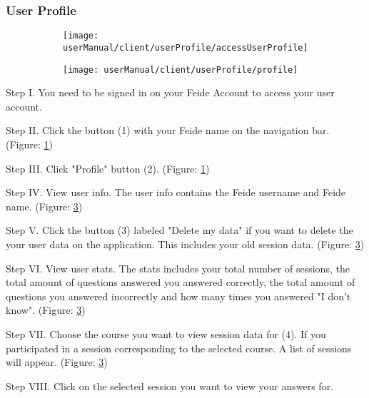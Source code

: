 \subsubsection{User Profile}
\begin{figure}[H]
	\begin{subfigure}{0.80\linewidth}
		\texttt{[image: userManual/client/userProfile/accessUserProfile]}
		\caption{}
		\label{fig:accessUserProfile}	
	\end{subfigure}
	\begin{subfigure}{0.80\linewidth}
		\texttt{[image: userManual/client/userProfile/profile]}
		\caption{}
		\label{fig:profilePage}
	\end{subfigure}
\end{figure}

\begin{userManualItemlist}
	\item[Step I.] You need to be signed in on your Feide Account to access your user account. 
	\item[Step II.] Click the button (1) with your Feide name on the navigation bar. (Figure: \ref{fig:accessUserProfile})
	\item[Step III.] Click "Profile" button (2). (Figure: \ref{fig:accessUserProfile})
	\item[Step IV.] View user info. The user info contains the Feide username and Feide name. (Figure: \ref{fig:profilePage})
	\item[Step V.] Click the button (3) labeled "Delete my data" if you want to delete the your user data on the application. This includes your old session data. (Figure: \ref{fig:profilePage})
	\item[Step VI.] View user stats. The stats includes your total number of sessions, the total amount of questions answered you answered correctly, the total amount of questions you answered incorrectly and how many times you answered "I don't know". (Figure: \ref{fig:profilePage})
	\item[Step VII.] Choose the course you want to view session data for (4). If you participated in a session corresponding to the selected course. A list of sessions will appear. (Figure: \ref{fig:profilePage})
	\item[Step VIII.] Click on the selected session you want to view your answers for.
\end{userManualItemlist}